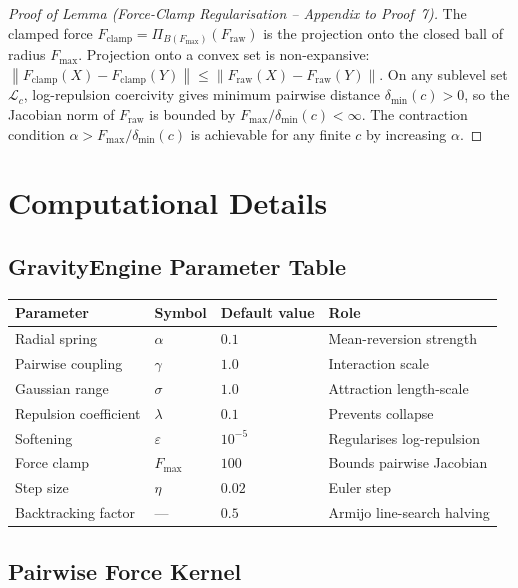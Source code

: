 \documentclass[11pt]{article}
\theoremstyle{definition}
\newcommand{\norm}[1]{\left\|#1\right\|}
\begin{document}
\begin{appendices}
\begin{proof}[Proof of Lemma (Force-Clamp Regularisation -- Appendix to Proof~7)]
The clamped force $F_{\mathrm{clamp}} = \Pi_{B(F_{\max})}(F_{\mathrm{raw}})$ is
the projection onto the closed ball of radius $F_{\max}$.  Projection onto a
convex set is non-expansive:
$\norm{F_{\mathrm{clamp}}(X) - F_{\mathrm{clamp}}(Y)} \le \norm{F_{\mathrm{raw}}(X) - F_{\mathrm{raw}}(Y)}$.
On any sublevel set $\mathcal{L}_c$, log-repulsion coercivity gives minimum pairwise
distance $\delta_{\min}(c) > 0$, so the Jacobian norm of
$F_{\mathrm{raw}}$ is bounded by $F_{\max}/\delta_{\min}(c) < \infty$.
The contraction condition $\alpha > F_{\max}/\delta_{\min}(c)$ is achievable
for any finite $c$ by increasing $\alpha$.
\end{proof}

\section{Computational Details}
\label{app:compute}

\subsection{GravityEngine Parameter Table}

\begin{center}
\begin{tabular}{llll}
\toprule
Parameter & Symbol & Default value & Role \\
\midrule
Radial spring & $\alpha$ & $0.1$ & Mean-reversion strength \\
Pairwise coupling & $\gamma$ & $1.0$ & Interaction scale \\
Gaussian range & $\sigma$ & $1.0$ & Attraction length-scale \\
Repulsion coefficient & $\lambda$ & $0.1$ & Prevents collapse \\
Softening & $\varepsilon$ & $10^{-5}$ & Regularises log-repulsion \\
Force clamp & $F_{\max}$ & $100$ & Bounds pairwise Jacobian \\
Step size & $\eta$ & $0.02$ & Euler step \\
Backtracking factor & --- & $0.5$ & Armijo line-search halving \\
\bottomrule
\end{tabular}
\end{center}

\subsection{Pairwise Force Kernel}


\end{appendices}
\end{document}
